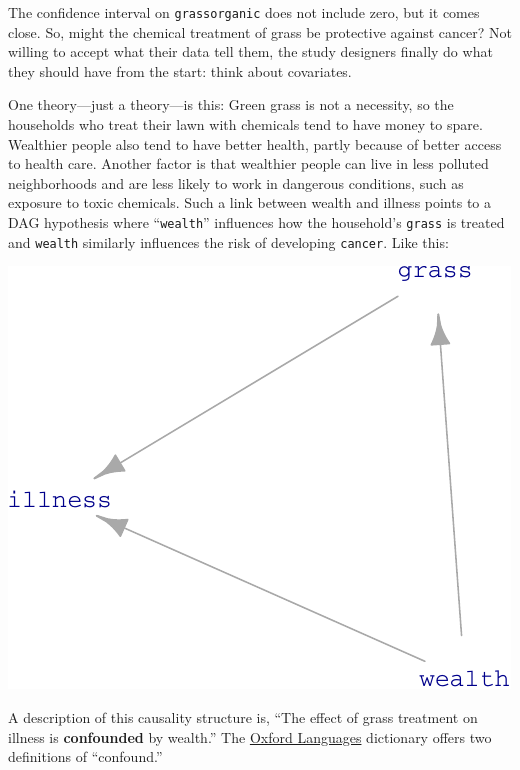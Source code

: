 \documentclass[
  letterpaper,
  DIV=11,
  numbers=noendperiod,
  oneside]{scrartcl}
\begin{document}
{}
The confidence interval on \texttt{grassorganic} does not include zero,
but it comes close. So, might the chemical treatment of grass be
protective against cancer? Not willing to accept what their data tell
them, the study designers finally do what they should have from the
start: think about covariates.

One theory---just a theory---is this: Green grass is not a necessity, so
the households who treat their lawn with chemicals tend to have money to
spare. Wealthier people also tend to have better health, partly because
of better access to health care. Another factor is that wealthier people
can live in less polluted neighborhoods and are less likely to work in
dangerous conditions, such as exposure to toxic chemicals. Such a link
between wealth and illness points to a DAG hypothesis where
``\texttt{wealth}'' influences how the household's \texttt{grass} is
treated and \texttt{wealth} similarly influences the risk of developing
\texttt{cancer}. Like this:

\includegraphics{test-tufte_files/figure-pdf/460-ConfoundingMJVjIC-1.pdf}

A description of this causality structure is, ``The effect of grass
treatment on illness is \textbf{confounded} by wealth.'' The
\href{https://languages.oup.com/google-dictionary-en/}{Oxford Languages}
dictionary offers two definitions of ``confound.''
\end{document}
